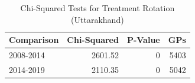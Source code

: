 \begin{table}[!h]
\centering
\caption{\label{tab:chi_sq_uk}Chi-Squared Tests for Treatment Rotation (Uttarakhand)}
\centering
\fontsize{8}{10}\selectfont
\begin{tabular}[t]{lrrr}
\toprule
Comparison & Chi-Squared & P-Value & GPs\\
\midrule
2008-2014 & 2601.52 & 0 & 5403\\
2014-2019 & 2110.35 & 0 & 5042\\
\bottomrule
\end{tabular}
\end{table}
